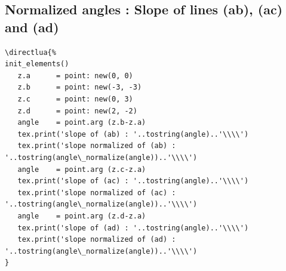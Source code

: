\subsection{Normalized angles : Slope of lines (ab), (ac) and (ad)} %
\label{sub:normalized_angles}
\begin{Verbatim}
\directlua{%
init_elements()
   z.a      = point: new(0, 0)
   z.b      = point: new(-3, -3)
   z.c      = point: new(0, 3)
   z.d      = point: new(2, -2)
   angle    = point.arg (z.b-z.a)
   tex.print('slope of (ab) : '..tostring(angle)..'\\\\')
   tex.print('slope normalized of (ab) : '..tostring(angle\_normalize(angle))..'\\\\')
   angle    = point.arg (z.c-z.a)
   tex.print('slope of (ac) : '..tostring(angle)..'\\\\')
   tex.print('slope normalized of (ac) : '..tostring(angle\_normalize(angle))..'\\\\')
   angle    = point.arg (z.d-z.a)
   tex.print('slope of (ad) : '..tostring(angle)..'\\\\')
   tex.print('slope normalized of (ad) : '..tostring(angle\_normalize(angle))..'\\\\')
}

\end{Verbatim}

